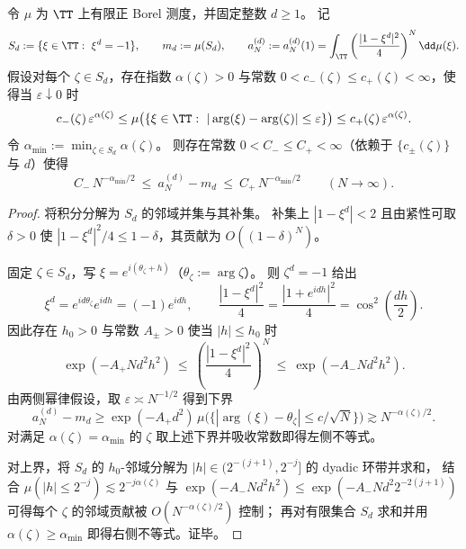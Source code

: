 \begin{theorem}\label{thm:xi-adams-fiber-spectral-dimension-minimum}
令 \(\mu\) 为 \(\TT\) 上有限正 Borel 测度，并固定整数 \(d\ge 1\)。
记
\[
S_d:=\{\xi\in\TT:\ \xi^{d}=-1\},\qquad
m_d:=\mu(S_d),\qquad
a_N^{(d)}:=a_N^{(d)}(1)=\int_{\TT}\left(\frac{|1-\xi^{d}|^2}{4}\right)^{N}\dd\mu(\xi).
\]
假设对每个 \(\zeta\in S_d\)，存在指数 \(\alpha(\zeta)>0\) 与常数 \(0<c_-(\zeta)\le c_+(\zeta)<\infty\)，使得当 \(\varepsilon\downarrow 0\) 时
\[
c_-(\zeta)\,\varepsilon^{\alpha(\zeta)}
\le
\mu\bigl(\{\xi\in\TT:\ |\arg(\xi)-\arg(\zeta)|\le \varepsilon\}\bigr)
\le
c_+(\zeta)\,\varepsilon^{\alpha(\zeta)}.
\]
令 \(\alpha_{\min}:=\min_{\zeta\in S_d}\alpha(\zeta)\)。
则存在常数 \(0<C_-\le C_+<\infty\)（依赖于 \(\{c_\pm(\zeta)\}\) 与 \(d\)）使得
\[
\boxed{\quad
C_-\,N^{-\alpha_{\min}/2}\ \le\ a_N^{(d)}-m_d\ \le\ C_+\,N^{-\alpha_{\min}/2}\qquad(N\to\infty).\quad}
\]
\end{theorem}
\begin{proof}
将积分分解为 \(S_d\) 的邻域并集与其补集。
补集上 \(|1-\xi^{d}|<2\) 且由紧性可取 \(\delta>0\) 使 \(|1-\xi^{d}|^2/4\le 1-\delta\)，其贡献为 \(O((1-\delta)^N)\)。
\par
固定 \(\zeta\in S_d\)，写 \(\xi=e^{i(\theta_\zeta+h)}\)（\(\theta_\zeta:=\arg\zeta\)）。
则 \(\zeta^{d}=-1\) 给出
\[
\xi^{d}=e^{id\theta_\zeta}e^{idh}=(-1)e^{idh},
\qquad
\frac{|1-\xi^{d}|^2}{4}
=\frac{|1+e^{idh}|^2}{4}
=\cos^2\!\left(\frac{dh}{2}\right).
\]
因此存在 \(h_0>0\) 与常数 \(A_\pm>0\) 使当 \(|h|\le h_0\) 时
\[
\exp(-A_+N d^2 h^2)\ \le\ \left(\frac{|1-\xi^{d}|^2}{4}\right)^{N}\ \le\ \exp(-A_-N d^2 h^2).
\]
由两侧幂律假设，取 \(\varepsilon\asymp N^{-1/2}\) 得到下界
\[
a_N^{(d)}-m_d
\ge
\exp(-A_+d^2)\,\mu\bigl(\{|\arg(\xi)-\theta_\zeta|\le c/\sqrt{N}\}\bigr)
\gtrsim N^{-\alpha(\zeta)/2}.
\]
对满足 \(\alpha(\zeta)=\alpha_{\min}\) 的 \(\zeta\) 取上述下界并吸收常数即得左侧不等式。
\par
对上界，将 \(S_d\) 的 \(h_0\)-邻域分解为 \(|h|\in(2^{-(j+1)},2^{-j}]\) 的 dyadic 环带并求和，
结合
\(
\mu(|h|\le 2^{-j})\lesssim 2^{-j\alpha(\zeta)}
\)
与
\(
\exp(-A_-N d^2 h^2)\le \exp(-A_-Nd^2 2^{-2(j+1)})
\)
可得每个 \(\zeta\) 的邻域贡献被 \(O(N^{-\alpha(\zeta)/2})\) 控制；
再对有限集合 \(S_d\) 求和并用 \(\alpha(\zeta)\ge \alpha_{\min}\) 即得右侧不等式。证毕。
\end{proof}

